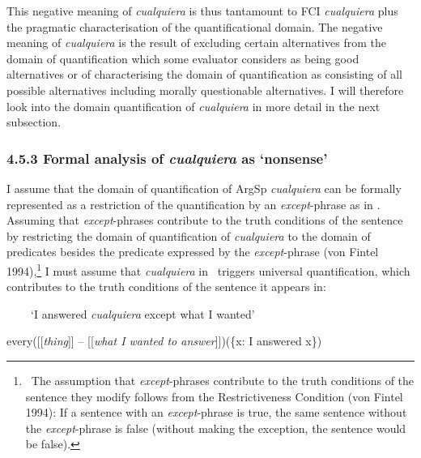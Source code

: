 \begin{styleStandard}
This negative meaning of \textit{cualquiera} is thus tantamount to FCI \textit{cualquiera} plus the pragmatic characterisation of the quantificational domain. The negative meaning of \textit{cualquiera }is the result of excluding certain alternatives from the domain of quantification which some evaluator considers as being good alternatives or of characterising the domain of quantification as consisting of all possible alternatives including morally questionable alternatives. I will therefore look into the domain quantification of \textit{cualquiera} in more detail in the next subsection. 
\end{styleStandard}

\subsubsection[4.5.3 Formal analysis of cualquiera as ‘nonsense’]{\textbf{4.5.3 Formal analysis of }\textbf{\textit{cualquiera}}\textbf{ as ‘nonsense’}}
\begin{styleStandard}
I assume that the domain of quantification of ArgSp \textit{cualquiera} can be formally represented as a restriction of the quantification by an \textit{except}{}-phrase as in . Assuming that \textit{except}{}-phrases contribute to the truth conditions of the sentence by restricting the domain of quantification of \textit{cualquiera} to the domain of predicates besides the predicate expressed by the \textit{except}{}-phrase (von Fintel 1994),\footnote{\textrm{\ The assumption that }\textrm{\textit{except}}\textrm{{}-phrases contribute to the truth conditions of the sentence they modify follows from the Restrictiveness Condition (von Fintel 1994): If a sentence with an }\textrm{\textit{except}}\textrm{{}-phrase is true, the same sentence without the }\textrm{\textit{except}}\textrm{{}-phrase is false (without making the exception, the sentence would be false).}} I must assume that \textit{cualquiera} in \ triggers universal quantification, which contributes to the truth conditions of the sentence it appears in:
\end{styleStandard}

\begin{styleStandard}
\label{bkm:Ref63461516}\textbf{\ \ }\ \ ‘I answered \textit{cualquiera} except what I wanted’
\end{styleStandard}

\begin{styleStandard}
every([[\textit{thing}]] – [[\textit{what I wanted to answer}]])(\{x: I answered x\})
\end{styleStandard}

